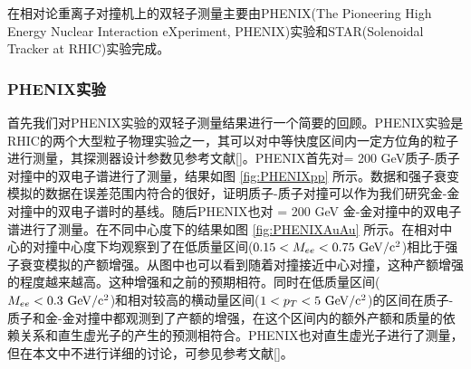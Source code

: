 在相对论重离子对撞机上的双轻子测量主要由PHENIX(The Pioneering High Energy Nuclear Interaction eXperiment, PHENIX)实验和STAR(Solenoidal Tracker at RHIC)实验完成。

\subsubsection{PHENIX实验}

首先我们对PHENIX实验的双轻子测量结果进行一个简要的回顾。PHENIX实验是RHIC的两个大型粒子物理实验之一，其可以对中等快度区间内一定方位角的粒子进行测量，其探测器设计参数见参考文献[]。PHENIX首先对\sNN = 200 GeV质子-质子对撞中的双电子谱进行了测量，结果如图 \ref{fig:PHENIXpp} 所示。数据和强子衰变模拟的数据在误差范围内符合的很好，证明质子-质子对撞可以作为我们研究金-金对撞中的双电子谱时的基线。随后PHENIX也对 \sNN = 200 GeV 金-金对撞中的双电子谱进行了测量。在不同中心度下的结果如图 \ref{fig:PHENIXAuAu} 所示。在相对中心的对撞中心度下均观察到了在低质量区间($ 0.15 < M_{ee} < 0.75~{\rm GeV/c^2}$)相比于强子衰变模拟的产额增强。从图中也可以看到随着对撞接近中心对撞，这种产额增强的程度越来越高。这种增强和之前的预期相符。同时在低质量区间($M_{ee} < 0.3~{\rm GeV/c^2}$)和相对较高的横动量区间($ 1 < p_T < 5 ~{\rm GeV/c^2}$)的区间在质子-质子和金-金对撞中都观测到了产额的增强，在这个区间内的额外产额和质量的依赖关系和直生虚光子的产生的预测相符合。PHENIX也对直生虚光子进行了测量，但在本文中不进行详细的讨论，可参见参考文献[]。

